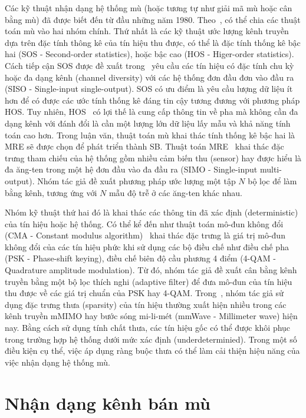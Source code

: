 Các kỹ thuật nhận dạng hệ thống mù (hoặc tương tự như giải mã mù hoặc cân bằng mù) đã được biết đến từ đầu những năm 1980. Theo~\cite{vilas2022}, có thể chia các thuật toán mù vào hai nhóm chính. Thứ nhất là các kỹ thuật ước lượng kênh truyền dựa trên đặc tính thông kê của tín hiệu thu được, có thể là đặc tính thống kê bậc hai (SOS - Second-order statistics), hoặc bậc cao (HOS - Higer-order statistics). Cách tiếp cận SOS được đề xuất trong~\cite{Tong1994} yêu cầu các tín hiệu có đặc tính chu kỳ hoặc đa dạng kênh (channel diversity) với các hệ thống đơn đầu đơn vào đầu ra (SISO - Single-input single-output). SOS có ưu điểm là yêu cầu lượng dữ liệu ít hơn để có được các ước tính thống kê đáng tin cậy tương đương với phương pháp HOS. Tuy nhiên, HOS~\cite{Giannakis1997} có lợi thế là cung cấp thông tin về pha mà không cần đa dạng kênh với đánh đổi là cần một lượng lớn dữ liệu lấy mẫu và khả năng tính toán cao hơn. Trong luận văn, thuật toán mù khai thác tính thống kê bậc hai là MRE sẽ được chọn để phát triển thành SB. Thuật toán MRE~\cite{original} khai thác đặc trưng tham chiếu của hệ thống gồm nhiều cảm biến thu (sensor) hay được hiểu là đa ăng-ten trong một hệ đơn đầu vào đa đầu ra (SIMO - Single-input multi-output). Nhóm tác giả đề xuất phương pháp ước lượng một tập $N$ bộ lọc để làm bằng kênh, tương ứng với $N$ mẫu độ trễ ở các ăng-ten khác nhau.

Nhóm kỹ thuật thứ hai đó là khai thác các thông tin đã xác định (deterministic) của tín hiệu hoặc hệ thống. Có thể kể đến như thuật toán mô-đun không đổi (CMA - Constant modulus algorithm)~\cite{Treichler1983} khai thác đặc trưng là giá trị mô-đun không đổi của các tín hiệu phức khi sử dụng các bộ điều chế như điều chế pha (PSK - Phase-shift keying), điều chế biên độ cầu phương 4 điểm (4-QAM - Quadrature amplitude modulation). Từ đó, nhóm tác giả đề xuất cân bằng kênh truyền bằng một bộ lọc thích nghi (adaptive filter) để đưa mô-đun của tín hiệu thu được về các giá trị chuẩn của PSK hay 4-QAM. Trong~\cite{Bey2011}, nhóm tác giả sử dụng đặc trưng thưa (sparsity) của tín hiệu thường xuất hiện nhiều trong các kênh truyền mMIMO hay bước sóng mi-li-mét (mmWave - Millimeter wave) hiện nay. Bằng cách sử dụng tính chất thưa, các tín hiệu gốc có thể được khôi phục trong trường hợp hệ thống dưới mức xác định (underdeterminied). Trong một số điều kiện cụ thể, việc áp dụng ràng buộc thưa có thể làm cải thiện hiệu năng của việc nhận dạng hệ thống mù.

\section{Nhận dạng kênh bán mù} \label{sec:semi}

